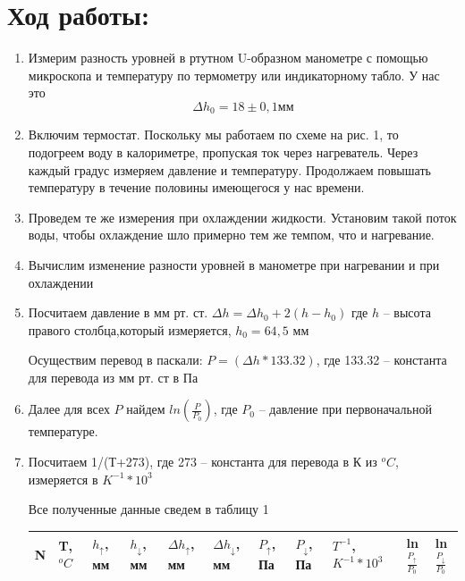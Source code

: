 \documentclass[a4paper,12pt]{article}
\begin{document}
\section{Ход работы:}
\begin{enumerate}
\itemsep0em
\item Измерим разность уровней в ртутном U-образном манометре с помощью микроскопа и температуру по термометру или индикаторному
табло. У нас это 
\begin{equation*}
\Delta h_0 = 18 \pm 0,1 \text{мм}
\end{equation*} 
\item Включим термостат. Поскольку мы работаем по схеме на  рис. 1, то подогреем воду в калориметре, пропуская ток через нагреватель. Через каждый градус измеряем давление и температуру.
Продолжаем повышать температуру в течение половины имеющегося у нас времени.
\item Проведем те же измерения при охлаждении жидкости.
Установим такой поток воды, чтобы охлаждение шло примерно тем же темпом, что и нагревание.
\\ 
\item Вычислим изменение разности уровней в манометре при нагревании и при охлаждении 
\item Посчитаем давление в мм рт. ст. $\Delta h = \Delta h_0 + 2(h - h_0)$  где $h$ -- высота правого столбца,который измеряется,
$h_0 = 64,5$ мм

Осуществим перевод в паскали: $P = (\Delta h*133.32)$, где  133.32 -- константа для перевода из мм рт. ст в Па
\item Далее для всех $P$ найдем  $ln(\frac{P}{P_0})$, где $P_0$ -- давление при первоначальной температуре.
\item Посчитаем 1/(Т+273), где 273 -- константа для перевода в К из $^oC$, измеряется в $K^{-1} * 10^3$

Все полученные данные сведем в таблицу 1

\begin{table}[h]
\begin{tabular}{|l|l|l|l|l|l|l|l|l|l|l|}
\hline 
N & T, $^oC$ & $h_\uparrow$, мм & $h_\downarrow$, мм & $\Delta h_\uparrow$, мм & $\Delta h_\downarrow$, мм &$P_\uparrow$, Па & $P_\downarrow$, Па & $T^{-1}$, $K^{-1}*10^{3}$ & ln$\frac{P_{\uparrow}}{P_0}$ & ln$\frac{P_{\downarrow}}{P_0}$ \\ 
\hline 


\end{tabular}
\end{table}
\end{enumerate}
\end{document}
